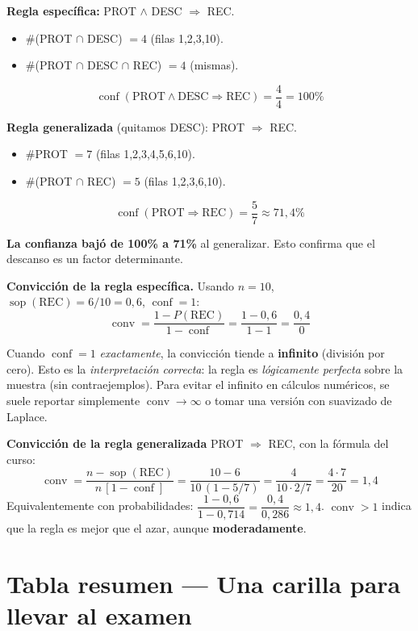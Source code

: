 \documentclass[11pt,a4paper]{article}
\newcommand{\conf}{\operatorname{conf}}
\newcommand{\sop}{\operatorname{sop}}
\newcommand{\conv}{\operatorname{conv}}
\begin{document}
\textbf{Regla específica:} PROT $\wedge$ DESC $\Rightarrow$ REC.
\begin{itemize}
    \item $\#$(PROT $\cap$ DESC) $= 4$ (filas 1,2,3,10).
    \item $\#$(PROT $\cap$ DESC $\cap$ REC) $= 4$ (mismas).
\end{itemize}
\[
\conf(\text{PROT} \wedge \text{DESC} \Rightarrow \text{REC}) = \frac{4}{4} = 100\%
\]

\textbf{Regla generalizada} (quitamos DESC): PROT $\Rightarrow$ REC.
\begin{itemize}
    \item $\#$PROT $= 7$ (filas 1,2,3,4,5,6,10).
    \item $\#$(PROT $\cap$ REC) $= 5$ (filas 1,2,3,6,10).
\end{itemize}
\[
\conf(\text{PROT} \Rightarrow \text{REC}) = \frac{5}{7} \approx 71{,}4\%
\]

\textbf{La confianza bajó de 100\% a 71\%} al generalizar. Esto confirma que el descanso
es un factor determinante.

\textbf{Convicción de la regla específica.} Usando $n = 10$, $\sop(\text{REC}) = 6/10 = 0{,}6$,
$\conf = 1$:
\[
\conv = \frac{1 - P(\text{REC})}{1 - \conf} = \frac{1 - 0{,}6}{1 - 1} = \frac{0{,}4}{0}
\]

\begin{tipbox}
Cuando $\conf = 1$ \emph{exactamente}, la convicción tiende a \textbf{infinito} (división por
cero). Esto es la \emph{interpretación correcta}: la regla es \emph{lógicamente perfecta} sobre
la muestra (sin contraejemplos). Para evitar el infinito en cálculos numéricos, se suele
reportar simplemente $\conv \to \infty$ o tomar una versión con suavizado de Laplace.
\end{tipbox}

\textbf{Convicción de la regla generalizada} PROT $\Rightarrow$ REC, con la fórmula del curso:
\[
\conv = \frac{n - \sop(\text{REC})}{n\,[1 - \conf]} = \frac{10 - 6}{10\,(1 - 5/7)} = \frac{4}{10 \cdot 2/7} = \frac{4 \cdot 7}{20} = 1{,}4
\]
Equivalentemente con probabilidades: $\dfrac{1 - 0{,}6}{1 - 0{,}714} = \dfrac{0{,}4}{0{,}286} \approx 1{,}4$.
$\conv > 1$ indica que la regla es mejor que el azar, aunque \textbf{moderadamente}.

\section{Tabla resumen — Una carilla para llevar al examen}
\end{document}
